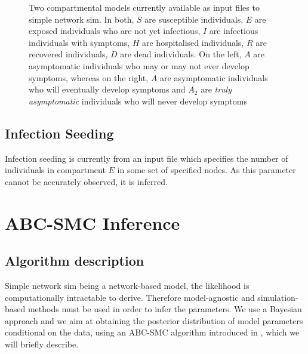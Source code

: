 \documentclass[11pt]{article}
\begin{document}
\begin{figure}[h!]
\caption{Two compartmental models currently available as input files to simple network sim.  In both, $S$ are susceptible individuals, $E$ are exposed individuals who are not yet infectious, $I$ are infectious individuals with symptoms, $H$ are hospitalised individuals, $R$ are recovered individuals, $D$ are dead individuals. On the left, $A$ are asymptomatic individuals who may or may not ever develop symptoms, whereas on the right, $A$ are asymptomatic individuals who will eventually develop symptoms and \textbf{$A_2$} are \emph{truly asymptomatic} individuals who will never develop symptoms}
\label{fig:compartments}
\end{figure}


\subsection{Infection Seeding}
Infection seeding is currently from an input file which specifies the number of individuals in compartment $E$ in some set of specified nodes. As this parameter cannot be accurately observed, it is inferred.

\section{ABC-SMC Inference}

\subsection{Algorithm description}

Simple network sim being a network-based model, the likelihood is computationally intractable to derive. Therefore model-agnostic and simulation-based methods must be used in order to infer the parameters.  We use a Bayesian approach and we aim at obtaining the posterior distribution of model parameters conditional on the data, using an ABC-SMC algorithm introduced in \cite{ABCSMC}, which we will briefly describe.
\end{document}

